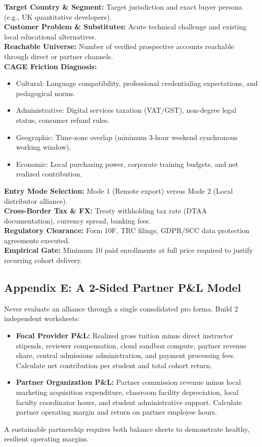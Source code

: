 \begin{tcolorbox}[colback=white,colframe=BayesSecondary,title=\textbf{Country-by-Country Market-Entry Diagnostic Card}]
\small
\textbf{Target Country \& Segment:} Target jurisdiction and exact buyer persona (e.g., UK quantitative developers). \\
\textbf{Customer Problem \& Substitutes:} Acute technical challenge and existing local educational alternatives. \\
\textbf{Reachable Universe:} Number of verified prospective accounts reachable through direct or partner channels. \\
\textbf{CAGE Friction Diagnosis:}
\begin{itemize}
\item Cultural: Language compatibility, professional credentialing expectations, and pedagogical norms.
\item Administrative: Digital services taxation (VAT/GST), non-degree legal status, consumer refund rules.
\item Geographic: Time-zone overlap (minimum 3-hour weekend synchronous working window).
\item Economic: Local purchasing power, corporate training budgets, and net realized contribution.
\end{itemize}
\textbf{Entry Mode Selection:} Mode 1 (Remote export) versus Mode 2 (Local distributor alliance). \\
\textbf{Cross-Border Tax \& FX:} Treaty withholding tax rate (DTAA documentation), currency spread, banking fees. \\
\textbf{Regulatory Clearance:} Form 10F, TRC filings, GDPR/SCC data protection agreements executed. \\
\textbf{Empirical Gate:} Minimum 10 paid enrollments at full price required to justify recurring cohort delivery.
\end{tcolorbox}

\subsection*{Appendix E: A 2-Sided Partner P\&L Model}
\label{sec:app_two_sided_pnl}

Never evaluate an alliance through a single consolidated pro forma. Build 2 independent worksheets:
\begin{itemize}
\item \textbf{Focal Provider P\&L:} Realized gross tuition minus direct instructor stipends, reviewer compensation, cloud sandbox compute, partner revenue share, central admissions administration, and payment processing fees. Calculate net contribution per student and total cohort return.
\item \textbf{Partner Organization P\&L:} Partner commission revenue minus local marketing acquisition expenditure, classroom facility depreciation, local faculty coordinator hours, and student administrative support. Calculate partner operating margin and return on partner employee hours.
\end{itemize}
A sustainable partnership requires both balance sheets to demonstrate healthy, resilient operating margins.

